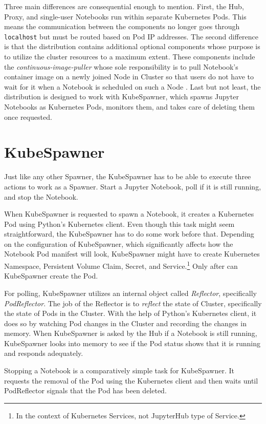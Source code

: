 \documentclass[
  digital,     %
  oneside,     %
  nosansbold,  %
  nocolorbold, %
  lof,         %
  nolot,         %
]{fithesis4}
\begin{document}
Three main differences are consequential enough to mention. First, the Hub, Proxy, and single-user Notebooks run within separate Kubernetes Pods. This means the communication between the components no longer goes through \texttt{localhost} but must be routed based on Pod IP addresses. The second difference is that the distribution contains additional optional components whose purpose is to utilize the cluster resources to a maximum extent. These components include the \emph{continuous-image-puller} whose sole responsibility is to pull Notebook's container image on a newly joined Node in Cluster so that users do not have to wait for it when a Notebook is scheduled on such a Node \cite{jupyterhub_optimizations}. Last but not least, the distribution is designed to work with KubeSpawner, which spawns Jupyter Notebooks as Kubernetes Pods, monitors them, and takes care of deleting them once requested.

\section{KubeSpawner}
\label{sec:kubespawner}
Just like any other Spawner, the KubeSpawner has to be able to execute three actions to work as a Spawner. Start a Jupyter Notebook, poll if it is still running, and stop the Notebook.

When KubeSpawner is requested to spawn a Notebook, it creates a Kubernetes Pod using Python's Kubernetes client. Even though this task might seem straightforward, the KubeSpawner has to do some work before that. Depending on the configuration of KubeSpawner, which significantly affects how the Notebook Pod manifest will look, KubeSpawner might have to create Kubernetes Namespace, Persistent Volume Claim, Secret, and Service.\footnote{In the context of Kubernetes Services, not JupyterHub type of Service.}
Only after can KubeSpawner create the Pod.

For polling, KubeSpawner utilizes an internal object called \emph{Reflector}, specifically \emph{PodReflector}. The job of the Reflector is to \emph{reflect} the state of Cluster, specifically the state of Pods in the Cluster. With the help of Python's Kubernetes client, it does so by watching Pod changes in the Cluster and recording the changes in memory. When KubeSpawner is asked by the Hub if a Notebook is still running, KubeSpawner looks into memory to see if the Pod status shows that it is running and responds adequately.

Stopping a Notebook is a comparatively simple task for KubeSpawner. It requests the removal of the Pod using the Kubernetes client and then waits until PodReflector signals that the Pod has been deleted.
\end{document}
